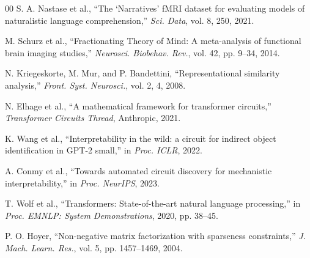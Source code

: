 \documentclass[conference]{IEEEtran}
\begin{document}
\begin{thebibliography}{00}
 S. A. Nastase et al., ``The `Narratives' fMRI dataset for evaluating models of naturalistic language comprehension,'' \textit{Sci. Data}, vol. 8, 250, 2021.

 M. Schurz et al., ``Fractionating Theory of Mind: A meta-analysis of functional brain imaging studies,'' \textit{Neurosci. Biobehav. Rev.}, vol. 42, pp. 9--34, 2014.

 N. Kriegeskorte, M. Mur, and P. Bandettini, ``Representational similarity analysis,'' \textit{Front. Syst. Neurosci.}, vol. 2, 4, 2008.

 N. Elhage et al., ``A mathematical framework for transformer circuits,'' \textit{Transformer Circuits Thread}, Anthropic, 2021.

 K. Wang et al., ``Interpretability in the wild: a circuit for indirect object identification in GPT-2 small,'' in \textit{Proc. ICLR}, 2022.

 A. Conmy et al., ``Towards automated circuit discovery for mechanistic interpretability,'' in \textit{Proc. NeurIPS}, 2023.

 T. Wolf et al., ``Transformers: State-of-the-art natural language processing,'' in \textit{Proc. EMNLP: System Demonstrations}, 2020, pp. 38--45.

 P. O. Hoyer, ``Non-negative matrix factorization with sparseness constraints,'' \textit{J. Mach. Learn. Res.}, vol. 5, pp. 1457--1469, 2004.

\end{thebibliography}
\end{document}

